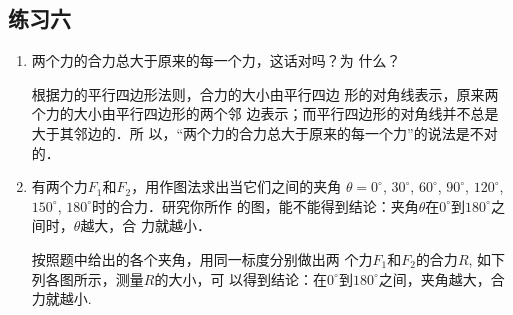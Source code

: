 \subsection{练习六}
\begin{enumerate}
\item 两个力的合力总大于原来的每一个力，这话对吗？为
什么？

\begin{solution}
    根据力的平行四边形法则，合力的大小由平行四边
形的对角线表示，原来两个力的大小由平行四边形的两个邻
边表示；而平行四边形的对角线并不总是大于其邻边的．所
以，“两个力的合力总大于原来的每一个力”的说法是不对的．
\end{solution}
\item 有两个力$F_1$和$F_2$，用作图法求出当它们之间的夹角
$\theta =0^\circ$, $30^\circ$, $60^\circ$, $90^\circ$, $120^\circ$, $150^\circ$, $180^\circ$时的合力．研究你所作
的图，能不能得到结论：夹角$\theta$在$0^\circ$到$180^\circ$之间时，$\theta $越大，合
力就越小．

\begin{solution}
    按照题中给出的各个夹角，用同一标度分别做出两
个力$F_1$和$F_2$的合力$R$, 如下列各图所示，测量$R$的大小，可
以得到结论：在$0^{\circ}$到$180^{\circ}$之间，夹角越大，合力就越小.

\begin{figure}[htp]\centering
    \begin{minipage}[t]{0.48\textwidth}
    \centering
{}
    \caption{}
    \end{minipage}
    \begin{minipage}[t]{0.48\textwidth}
    \centering
    \caption{}
    \end{minipage}
    \end{figure}


\end{solution}
\end{enumerate}
